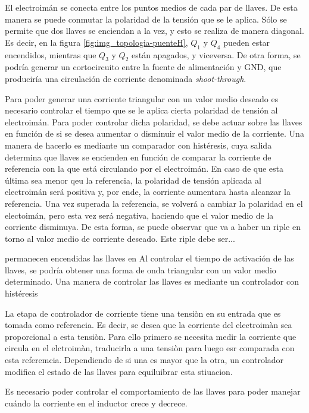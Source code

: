 El electroimán se conecta entre los puntos medios de cada par de llaves. De esta manera se puede conmutar la polaridad de la tensión que se le aplica. Sólo se permite que dos llaves se enciendan a la vez, y esto se realiza de manera diagonal. Es decir, en la figura \ref{fig:img_topologia-puenteH}, $Q_1$ y $Q_4$ pueden estar encendidos, mientras que $Q_3$ y $Q_2$ están apagados, y viceversa. De otra forma, se podría generar un cortocircuito entre la fuente de alimentación y GND, que produciría una circulación de corriente denominada \textsl{shoot-through}.

Para poder generar una corriente triangular con un valor medio deseado es necesario controlar el tiempo que se le aplica cierta polaridad de tensión al electroimán. Para poder controlar dicha polaridad, se debe actuar sobre las llaves en función de si se desea aumentar o disminuir el valor medio de la corriente.  Una manera de hacerlo es mediante un comparador con histéresis, cuya salida determina que llaves se encienden en función de comparar la corriente de referencia con la que está circulando por el electroimán. En caso de que esta última sea menor qeu la referencia, la polaridad de tensión aplicada al electroimán será positiva y, por ende, la corriente aumentara hasta alcanzar la referencia. Una vez superada la referencia, se volverá a cambiar la polaridad en el electoimán, pero esta vez será negativa, haciendo que el valor medio de la corriente disminuya. De esta forma, se puede observar que va a haber un riple en torno al valor medio de corriente deseado.  Este riple debe ser...

permanecen encendidas las llaves en 
Al controlar el tiempo de activación de las llaves, se podría obtener una forma de onda triangular con un valor medio determinado. Una manera de controlar las llaves es mediante un controlador con histéresis

La etapa de controlador de corriente tiene una tensiòn en su entrada que es tomada como referencia. Es decir, se desea que la corriente del electroimàn sea proporcional a esta tensiòn. Para ello primero se necesita medir la corriente que circula en el elctroimàn, traducirla a una tensiòn para luego esr comparada con esta referemcia. Dependiendo de si una es mayor que la otra, un controlador modifica el estado de las llaves para equiluibrar esta stiuacion. 

Es necesario poder controlar el comportamiento de las llaves para poder manejar cuándo la corriente en el inductor crece y decrece. 


